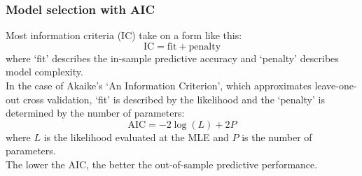 \documentclass[color=usenames,dvipsnames]{beamer}\usepackage[]{graphicx}\usepackage[]{xcolor}
\begin{document}
\begin{frame}
  \frametitle{Model selection with AIC}
  \small
  Most information criteria (IC) take on a form like this:
  \[
     \mathrm{IC} = \mathrm{fit} + \mathrm{penalty}
  \]
  where `fit' describes the \alert{in-sample} predictive accuracy and 
  `penalty' describes model complexity. \\
  \pause
  \vfill
  In the case of Akaike's `An Information Criterion', which
  approximates leave-one-out cross validation, `fit' is described by
  the likelihood and the `penalty' is determined by the number of parameters:
  \[
     \mathrm{AIC} = -2 \log(L) + 2P 
   \]
   where $L$ is the likelihood evaluated at the MLE and $P$ is
   the number of parameters. \\
   \pause
   \vfill
   The lower the AIC, the better the \alert{out-of-sample} predictive
   performance.
\end{frame}




\end{document}
